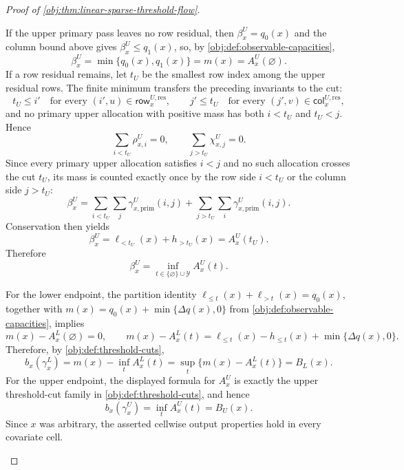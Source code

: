 \documentclass[11pt]{article}
\begin{document}
\begin{proof}[Proof of \cref{obj:thm:linear-sparse-threshold-flow}]
\begin{enumerate}
If the upper primary pass leaves no row residual, then \(\beta_x^U=q_0(x)\) and the column bound above gives \(\beta_x^U\le q_1(x)\), so, by \cref{obj:def:observable-capacities},
\[
\beta_x^U=\min\{q_0(x),q_1(x)\}=m(x)=A_x^U(\varnothing).
\]
If a row residual remains, let \(t_U\) be the smallest row index among the upper residual rows.  The finite minimum transfers the preceding invariants to the cut:
\[
t_U\le i'\quad\text{for every }(i',u)\in\mathsf{row}_{x}^{U,\mathrm{res}},
\qquad
j'\le t_U\quad\text{for every }(j',v)\in\mathsf{col}_{x}^{U,\mathrm{res}},
\]
and no primary upper allocation with positive mass has both \(i<t_U\) and \(t_U<j\).  Hence
\[
\sum_{i<t_U}\rho_{x,i}^U=0,
\qquad
\sum_{j>t_U}\chi_{x,j}^U=0.
\]
Since every primary upper allocation satisfies \(i<j\) and no such allocation crosses the cut \(t_U\), its mass is counted exactly once by the row side \(i<t_U\) or the column side \(j>t_U\):
\[
\beta_x^U
=
\sum_{i<t_U}\sum_j\gamma_{x,\mathrm{prim}}^U(i,j)
+
\sum_{j>t_U}\sum_i\gamma_{x,\mathrm{prim}}^U(i,j).
\]
Conservation then yields
\[
\beta_x^U
=
\ell_{<t_U}(x)+h_{>t_U}(x)
=A_x^U(t_U).
\]
Therefore
\[
\beta_x^U
=
\inf_{t\in\{\varnothing\}\cup\mathcal Y} A_x^U(t).
\]

For the lower endpoint, the partition identity \(\ell_{\le t}(x)+\ell_{>t}(x)=q_0(x)\), together with \(m(x)=q_0(x)+\min\{\Delta q(x),0\}\) from \cref{obj:def:observable-capacities}, implies
\[
m(x)-A_x^L(\varnothing)=0,
\qquad
m(x)-A_x^L(t)
=\ell_{\le t}(x)-h_{\le t}(x)+\min\{\Delta q(x),0\}.
\]
Therefore, by \cref{obj:def:threshold-cuts},
\[
b_x(\gamma_x^L)
=m(x)-\inf_t A_x^L(t)
=\sup_t\{m(x)-A_x^L(t)\}
=B_L(x).
\]
For the upper endpoint, the displayed formula for \(A_x^U\) is exactly the upper threshold-cut family in \cref{obj:def:threshold-cuts}, and hence
\[
b_x(\gamma_x^U)
=\inf_t A_x^U(t)
=B_U(x).
\]
Since \(x\) was arbitrary, the asserted cellwise output properties hold in every covariate cell.
\end{enumerate}
\end{proof}
\end{document}
